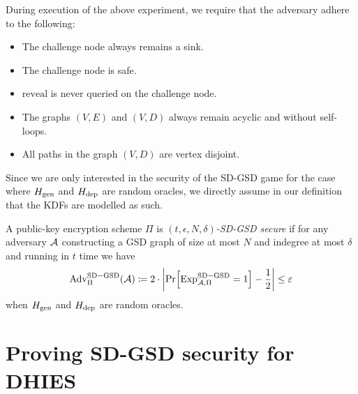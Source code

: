 \begin{definition}
	During execution of the above experiment, we require that the adversary adhere to the following:
	\begin{itemize}
		\item The challenge node always remains a sink.
		\item The challenge node is safe.
		\item $\mathrm{reveal}$ is never queried on the challenge node.
		\item The graphs $(V, E)$ and $(V, D)$ always remain acyclic and without self-loops.
		\item All paths in the graph $(V, D)$ are vertex disjoint.
	\end{itemize}
\end{definition}


Since we are only interested in the security of the SD-GSD game for the case where $H_\mathrm{gen}$ and $H_\mathrm{dep}$ are random oracles, we directly assume in our definition that the KDFs are modelled as such.

\begin{definition}
	A public-key encryption scheme $\Pi$ is \emph{$(t, \epsilon, N, \delta)$-SD-GSD secure} if for any adversary $\mathcal{A}$ constructing a GSD graph of size at most $N$ and indegree at most $\delta$ and running in $t$ time we have
	\begin{align*}
		\mathrm{Adv}_{\Pi}^{\mathrm{SD-GSD}}(\adv) \coloneqq 2 \cdot \abs*{\pr{\mathrm{Exp}_{\adv, \Pi}^{\mathrm{SD-GSD}} = 1} - \frac{1}{2}} \le \epsilon
	\end{align*}
	when $H_\mathrm{gen}$ and $H_\mathrm{dep}$ are random oracles.
\end{definition}

\section{Proving SD-GSD security for DHIES}


